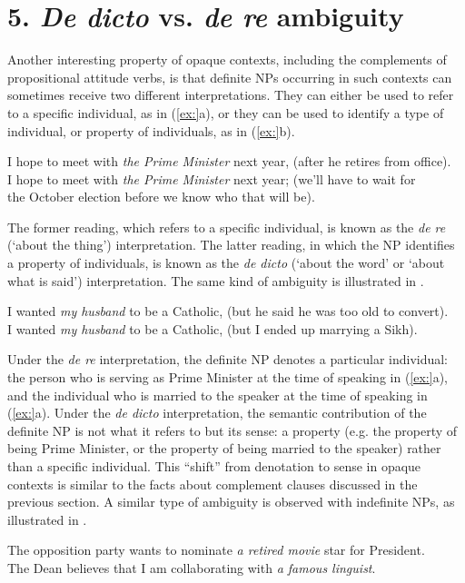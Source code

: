 \section{5. \textit{De dicto} vs. \textit{de re} ambiguity}\label{sec:}

Another interesting property of opaque contexts, including the complements of propositional attitude verbs, is that definite NPs occurring in such contexts can sometimes receive two different interpretations. They can either be used to refer to a specific individual, as in (\ref{ex:}a), or they can be used to identify a type of individual, or property of individuals, as in (\ref{ex:}b).


\ea
\ea I hope to meet with \textit{the Prime Minister} next year, (after he retires from office).\\
\ex I hope to meet with \textit{the Prime Minister} next year; (we’ll have to wait for\\
  the October election before we know who that will be).
                       \z
\z


The former reading, which refers to a specific individual, is known as the \textit{de re} (‘about the thing’) interpretation. The latter reading, in which the NP identifies a property of individuals, is known as the \textit{de dicto} (‘about the word’ or ‘about what is said’) interpretation. The same kind of ambiguity is illustrated in .


\ea
\ea I wanted \textit{my husband} to be a Catholic, (but he said he was too old to convert).\\
\ex I wanted \textit{my husband} to be a Catholic, (but I ended up marrying a Sikh).
                       \z
\z


Under the \textit{de re} interpretation, the definite NP denotes a particular individual: the person who is serving as Prime Minister at the time of speaking in (\ref{ex:}a), and the individual who is married to the speaker at the time of speaking in (\ref{ex:}a). Under the \textit{de dicto} interpretation, the semantic contribution of the definite NP is not what it refers to but its sense: a property (e.g. the property of being Prime Minister, or the property of being married to the speaker) rather than a specific individual. This “shift” from denotation to sense in opaque contexts is similar to the facts about complement clauses discussed in the previous section. A similar type of ambiguity is observed with indefinite NPs, as illustrated in .


\ea
\ea The opposition party wants to nominate \textit{a retired movie} star for President.\\
\ex The Dean believes that I am collaborating with \textit{a famous linguist}.
                       \z
\z


